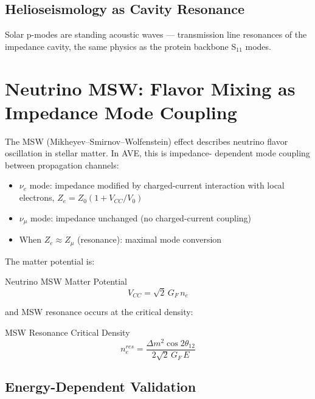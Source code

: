 \subsection{Helioseismology as Cavity Resonance}

Solar p-modes are standing acoustic waves --- transmission
line resonances of the impedance cavity, the same physics
as the protein backbone S$_{11}$ modes.

\section{Neutrino MSW: Flavor Mixing as Impedance Mode Coupling}
\label{sec:neutrino_msw}

The MSW (Mikheyev--Smirnov--Wolfenstein) effect describes neutrino
flavor oscillation in stellar matter.  In AVE, this is impedance-
dependent mode coupling between propagation channels:
\begin{itemize}
  \item $\nu_e$ mode: impedance modified by charged-current interaction
    with local electrons, $Z_e = Z_0 (1 + V_{CC}/V_0)$
  \item $\nu_\mu$ mode: impedance unchanged (no charged-current coupling)
  \item When $Z_e \approx Z_\mu$ (resonance): maximal mode conversion
\end{itemize}
The matter potential is:
\begin{resultbox}{Neutrino MSW Matter Potential}
\begin{equation}
    V_{CC} = \sqrt{2}\, G_F\, n_e
\end{equation}
\end{resultbox}
and MSW resonance occurs at the critical density:
\begin{resultbox}{MSW Resonance Critical Density}
\begin{equation}
    n_e^{res} = \frac{\Delta m^2 \cos 2\theta_{12}}{2\sqrt{2}\, G_F\, E}
\end{equation}
\end{resultbox}

\subsection{Energy-Dependent Validation}

